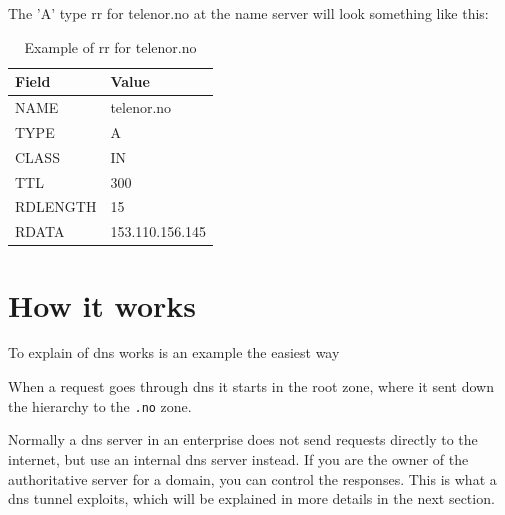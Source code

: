 The 'A' type \gls{rr} for telenor.no at the name server will look something like this:

\begin{table}
\centering
\begin{tabular}[c]{|l|l|}
\hline
\textbf{Field} & \textbf{Value} \\ \hline
NAME & telenor.no \\ \hline
TYPE & A \\ \hline
CLASS & IN \\ \hline
TTL & 300 \\ \hline
RDLENGTH & 15 \\ \hline
RDATA & 153.110.156.145 \\ \hline

\end{tabular}
\caption{\label{tab:rrexample}Example of \gls{rr} for telenor.no}
\end{table}


\section{How it works}
To explain of \Gls{dns} works is an example the easiest way

When a request goes through \Gls{dns} it starts in the root zone, where it sent down the hierarchy to the \texttt{.no} zone.



Normally a \Gls{dns} server in an enterprise does not send requests directly to the internet, but use an internal \Gls{dns} server instead. If you are the owner of the authoritative server for a domain, you can control the responses. This is what a \Gls{dns} tunnel exploits, which will be explained in more details in the next section. 





 